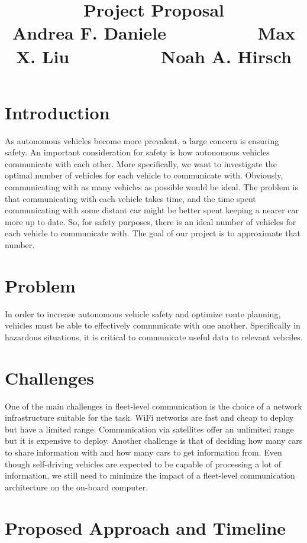 \documentclass{article}
\title{Project Proposal\vspace{-6pt}\\{\large Andrea F. Daniele $\hspace{2cm}$ Max X. Liu $\hspace{2cm}$ Noah A. Hirsch }}
\begin{document}
\maketitle


\vspace{-1.2cm}

\section*{Introduction}
\vspace{-.3cm}
As autonomous vehicles become more prevalent, a large concern is ensuring safety. An important consideration for safety is how autonomous vehicles communicate with each other. More specifically, we want to investigate the optimal number of vehicles for each vehicle to communicate with. Obviously, communicating with as many vehicles as possible would be ideal. The problem is that communicating with each vehicle takes time, and the time spent communicating with some distant car might be better spent keeping a nearer car more up to date. So, for safety purposes, there is an ideal number of vehicles for each vehicle to communicate with. The goal of our project is to approximate that number.


\section*{Problem}
\vspace{-.3cm}
In order to increase autonomous vehicle safety and optimize route planning, vehicles must be able to effectively communicate with one another. Specifically in hazardous situations, it is critical to communicate useful data to relevant vehciles.

\section*{Challenges}
\vspace{-.3cm}
One of the main challenges in fleet-level communication is the choice of a network infrastructure suitable
for the task. WiFi networks are fast and cheap to deploy but have a limited range. Communication via satellites
offer an unlimited range but it is expensive to deploy. Another challenge is that of deciding how many cars
to share information with and how many cars to get information from. Even though self-driving vehicles are
expected to be capable of processing a lot of information, we still need to minimize the impact of a fleet-level
communication architecture on the on-board computer.

\section*{Proposed Approach and Timeline}
\vspace{-.3cm}




%
%
\end{document}
